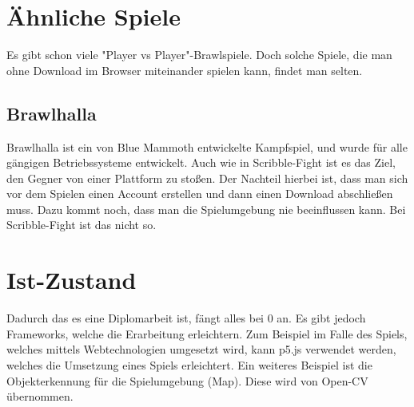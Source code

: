 \section{Ähnliche Spiele}
Es gibt schon viele "Player vs Player"-Brawlspiele. Doch solche Spiele, die man ohne Download im Browser
miteinander spielen kann, findet man selten. 

\subsection{Brawlhalla}
Brawlhalla ist ein von Blue Mammoth entwickelte Kampfspiel, und wurde für alle gängigen Betriebssysteme entwickelt. 
Auch wie in Scribble-Fight ist es das Ziel, den Gegner von einer Plattform zu stoßen.
Der Nachteil hierbei ist, dass man sich vor dem Spielen einen Account erstellen
und dann einen Download abschließen muss. Dazu kommt noch, dass man die Spielumgebung nie beeinflussen kann.
Bei Scribble-Fight ist das nicht so. 

\section{Ist-Zustand}
Dadurch das es eine Diplomarbeit ist, fängt alles bei 0 an. Es gibt jedoch Frameworks,
welche die Erarbeitung erleichtern. Zum Beispiel im Falle des Spiels, welches
mittels Webtechnologien umgesetzt wird, kann p5.js verwendet werden, welches die
Umsetzung eines Spiels erleichtert. Ein weiteres Beispiel ist die Objekterkennung für
die Spielumgebung (Map). Diese wird von Open-CV übernommen.